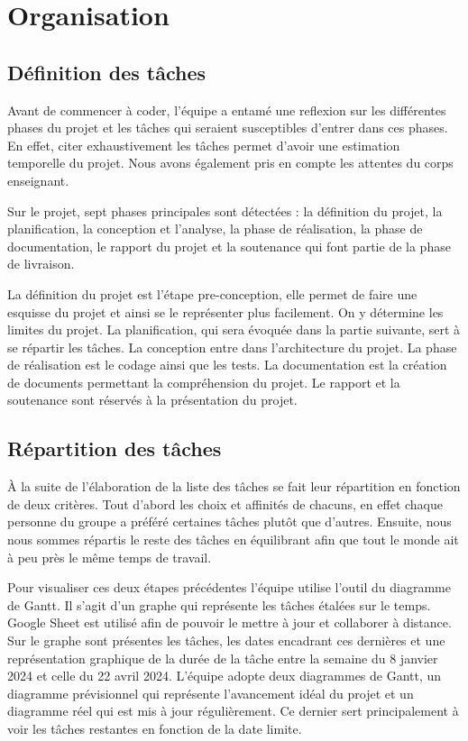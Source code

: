\documentclass[a4paper,12pt]{article}
\begin{document}
\newpage
\section{Organisation}


\subsection{Définition des tâches}
Avant de commencer à coder, l’équipe a entamé une reflexion sur les différentes phases du projet et les tâches qui seraient susceptibles d’entrer dans ces phases. 
En effet, citer exhaustivement les tâches permet d’avoir une estimation temporelle du projet. 
Nous avons également pris en compte les attentes du corps enseignant.

Sur le projet, sept phases principales sont détectées : la définition du projet, la planification, la conception et l'analyse, la phase de réalisation, la phase de documentation, le rapport du projet et la soutenance qui font partie de la phase de livraison.

La définition du projet est l’étape pre-conception, elle permet de faire une esquisse du projet et ainsi se le représenter plus facilement. 
On y détermine les limites du projet. 
La planification, qui sera évoquée dans la partie suivante, sert à se répartir les tâches. 
La conception entre dans l’architecture du projet.
La phase de réalisation est le codage ainsi que les tests. 
La documentation est la création de documents permettant la compréhension du projet. 
Le rapport et la soutenance sont réservés à la présentation du projet.

\subsection{Répartition des tâches}
À la suite de l’élaboration de la liste des tâches se fait leur répartition en fonction de deux critères. 
Tout d’abord les choix et affinités de chacuns, en effet chaque personne du groupe a préféré certaines tâches plutôt que d’autres. 
Ensuite, nous nous sommes répartis le reste des tâches en équilibrant afin que tout le monde ait à peu près le même temps de travail.

Pour visualiser ces deux étapes précédentes l’équipe utilise l'outil du diagramme de Gantt. 
Il s’agit d’un graphe qui représente les tâches étalées sur le temps. 
Google Sheet est utilisé afin de pouvoir le mettre à jour et collaborer à distance.
Sur le graphe sont présentes les tâches, les dates encadrant ces dernières et une représentation graphique de la durée de la tâche entre la semaine du 8 janvier 2024 et celle du 22 avril 2024.
L’équipe adopte deux diagrammes de Gantt, un diagramme prévisionnel qui représente l’avancement idéal du projet et un diagramme réel qui est mis à jour régulièrement. 
Ce dernier sert principalement à voir les tâches restantes en fonction de la date limite.
\end{document}
